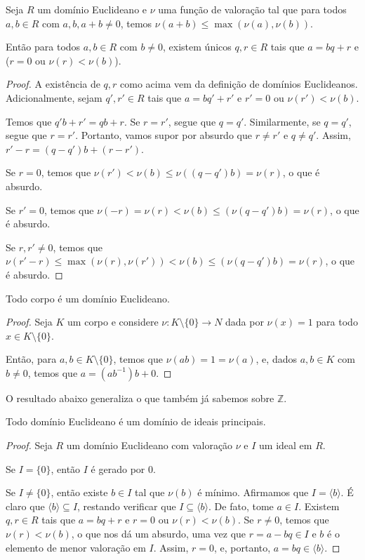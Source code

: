 \begin{prop}
    Seja $R$ um domínio Euclideano e $\nu$ uma função de valoração tal que
    para todos $a, b\in R$ com $a, b, a+b\neq 0$, temos $\nu(a+b)\leq \max(\nu(a), \nu(b))$.
    
    Então para todos $a, b \in R$ com $b\neq 0$, existem únicos $q, r \in R$ tais que $a=bq+r$ e ($r=0$ ou $\nu(r)<\nu(b)$).
\end{prop}
\begin{proof}
    A existência de $q, r$ como acima vem da definição de domínios Euclideanos.
    Adicionalmente, sejam $q', r' \in R$ tais que $a=bq'+r'$ e $r'=0$ ou $\nu(r')<\nu(b)$.

    Temos que $q'b+r'=qb+r$.
    Se $r=r'$, segue que $q=q'$.
    Similarmente, se $q=q'$, segue que $r=r'$.
    Portanto, vamos supor por absurdo que $r\neq r'$ e $q\neq q'$.
    Assim, $r'-r=(q-q')b+(r-r')$.
    
    Se $r=0$, temos que $\nu(r')<\nu(b)\leq \nu((q-q')b)=\nu(r)$, o que é absurdo.

    Se $r'=0$, temos que $\nu(-r)=\nu(r)<\nu(b)\leq(\nu(q-q')b)=\nu(r)$, o que é absurdo.
    
    Se $r, r'\neq 0$, temos que $\nu(r'-r)\leq \max(\nu(r), \nu(r'))<\nu(b)\leq(\nu(q-q')b)=\nu(r)$, o que é absurdo.
\end{proof}

\begin{prop}
    Todo corpo é um domínio Euclideano.
\end{prop}
\begin{proof}
Seja $K$ um corpo e considere $\nu:K\setminus \{0\}\to N$ dada por $\nu(x)=1$ para todo $x\in K\setminus \{0\}$.

    Então, para $a, b \in K\setminus \{0\}$, temos que $\nu(ab)=1=\nu(a)$,
    e, dados $a, b\in K$ com $b\neq 0$, temos que $a=(ab^{-1})b+0$.
\end{proof}

O resultado abaixo generaliza o que também já sabemos sobre $\mathbb Z$.
\begin{prop}
Todo domínio Euclideano é um domínio de ideais principais.
\end{prop}
\begin{proof}
    Seja $R$ um domínio Euclideano com valoração $\nu$ e $I$ um ideal em $R$.

    Se $I=\{0\}$, então $I$ é gerado por $0$.

    Se $I\neq \{0\}$, então existe $b\in I$ tal que $\nu(b)$ é mínimo.
    Afirmamos que $I=\langle b\rangle$.
    É claro que $\langle b\rangle\subseteq I$, restando verificar que $I\subseteq \langle b\rangle$.
    De fato, tome $a \in I$.
    Existem $q, r \in R$ tais que $a=bq+r$ e $r=0$ ou $\nu(r)<\nu(b)$.
    Se $r\neq 0$, temos que $\nu(r)<\nu(b)$, o que nos dá um absurdo, uma vez que $r=a-bq\in I$ e $b$ é o elemento de menor valoração em $I$.
    Assim, $r=0$, e, portanto, $a=bq\in \langle b\rangle$.
\end{proof}





